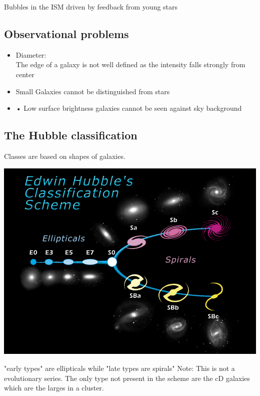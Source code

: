 \documentclass[11pt,a4paper]{article}
\begin{document}
Bubbles in the ISM driven by feedback from young stars

\subsection{Observational problems}

\begin{itemize}
   \item Diameter: \\ 
       The edge of a galaxy is not well defined as the intensity falls strongly from center
   \item Small Galaxies cannot be distinguished
from stars
\item • Low surface brightness galaxies cannot be
seen against sky background
\end{itemize}
\subsection{The Hubble classification}
Classes are based on shapes of galaxies.
\begin{center}
    \includegraphics[width=0.8\linewidth]{screenshot_2024-01-24-120628.png}
\end{center}
"early types" are ellipticals while "late types are spirals"
Note: This is not a evolutionary series. 
The only type not present in the scheme are the cD galaxies which are the larges in a cluster. 
\end{document}
